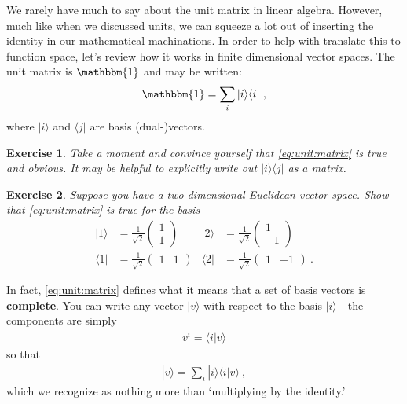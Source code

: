\documentclass[
  11pt,
	colorful,
	raggedright,
]{tufte-style-thesis-flip}
\newtheorem{exercise}{Exercise}[section]
\begin{document}
We rarely have much to say about the unit matrix in linear algebra. However, much like when we discussed units, we can squeeze a lot out of inserting the identity in our mathematical machinations. In order to help with translate this to function space, let's review how it works in finite dimensional vector spaces. The unit matrix is $\mathbbm{1}$ and may be written:
\begin{align}
  \mathbbm{1} = \sum_i |i\rangle\langle i| \ ,
  \label{eq:unit:matrix}
\end{align}
where $|i\rangle$ and $\langle j|$ are basis (dual-)vectors. 
\begin{exercise}
Take a moment and convince yourself that \eqref{eq:unit:matrix} is true and obvious. It may be helpful to explicitly write out $|i\rangle \langle j|$ as a matrix. 
\end{exercise}
\begin{exercise}\label{ex:completeness:for:non:cartesian:basis}
Suppose you have a two-dimensional Euclidean vector space. Show that \eqref{eq:unit:matrix} is true for the basis
\begin{align}
  |1 \rangle &= 
  \frac{1}{\sqrt{2}}
  \begin{pmatrix}
  1 \\ 1
  \end{pmatrix}
  &
  |2 \rangle &= 
  \frac{1}{\sqrt{2}}
  \begin{pmatrix}
  1 \\ -1
  \end{pmatrix}
  \\
  \langle 1 | &= 
  \frac{1}{\sqrt{2}}
  \begin{pmatrix}
  1 & 1
  \end{pmatrix}
  &
  \langle 2 | &= 
  \frac{1}{\sqrt{2}}
  \begin{pmatrix}
  1 & -1
  \end{pmatrix} \ .
\end{align}
\end{exercise}
In fact, \eqref{eq:unit:matrix} defines what it means that a set of basis vectors is \textbf{complete}. You can write any vector $|v\rangle$ with respect to the basis $|i\rangle$---the components are simply
\begin{align}
  v^i = \langle i | v \rangle
\end{align}
so that 
\begin{align}
  |v\rangle = \sum_i |i\rangle \langle i | v \rangle \ ,
  \label{eq:completeness:by:inserting:1}
\end{align}
which we recognize as nothing more than `multiplying by the identity.' 
%
\end{document}
